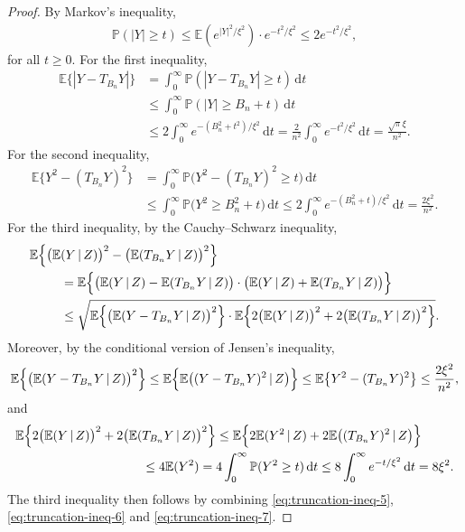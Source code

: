 \documentclass[12pt]{article}
\begin{document}
\begin{proof}
    By Markov's inequality,
    \begin{align*}
        \mathbb{P}(|Y|\geq t) \leq \mathbb{E}(e^{|Y|^2/\xi^2}) \cdot e^{-t^2/\xi^2} \leq 2e^{-t^2/\xi^2},
    \end{align*}
    for all $t\geq 0$. For the first inequality,
    \begin{align*}
        \mathbb{E}\{|Y - T_{B_n}Y|\} &= \int_0^{\infty} \mathbb{P}(|Y - T_{B_n}Y| \geq t) \,\mathrm{d}t\\
        &\leq \int_0^{\infty} \mathbb{P}(|Y| \geq B_n + t) \,\mathrm{d}t\\
        &\leq 2\int_0^{\infty} e^{-(B_n^2 + t^2)/\xi^2}\,\mathrm{d}t = \frac{2}{n^2} \int_0^{\infty} e^{-t^2/\xi^2}\,\mathrm{d}t = \frac{\sqrt{\pi} \xi}{n^2}.
    \end{align*}
    For the second inequality,
    \begin{align*}
        \mathbb{E}\bigl\{Y^2 - (T_{B_n}Y)^2\bigr\} &= \int_0^{\infty} \mathbb{P}\bigl(Y^2 - (T_{B_n}Y)^2 \geq t\bigr)\,\mathrm{d}t\\
        &\leq \int_0^{\infty} \mathbb{P}\bigl(Y^2 \geq B_n^2 + t\bigr) \,\mathrm{d}t \leq 2 \int_0^{\infty} e^{-(B_n^2 + t)/\xi^2} \,\mathrm{d}t = \frac{2\xi^2}{n^2}.
    \end{align*}
    For the third inequality, by the Cauchy--Schwarz inequality,
    \begin{align}
        \mathbb{E}\Bigl\{\bigl(\mathbb{E}&(Y\,|\,Z)\bigr)^2 - \bigl(\mathbb{E}(T_{B_n}Y\,|\,Z)\bigr)^2 \Bigr\}\nonumber\\
        &= \mathbb{E}\Bigl\{\bigl(\mathbb{E}(Y\,|\,Z) -\mathbb{E}(T_{B_n}Y\,|\,Z)\bigr) \cdot \bigl(\mathbb{E}(Y\,|\,Z) +\mathbb{E}(T_{B_n}Y\,|\,Z)\bigr) \Bigr\} \nonumber\\
        &\leq \sqrt{\mathbb{E}\Bigl\{\bigl(\mathbb{E}(Y-T_{B_n}Y\,|\,Z)\bigr)^2\Bigr\} \cdot \mathbb{E}\Bigl\{2\bigl(\mathbb{E}(Y\,|\,Z)\bigr)^2 + 2\bigl(\mathbb{E}(T_{B_n}Y\,|\,Z)\bigr)^2 \Bigr\}}. \label{eq:truncation-ineq-5}
    \end{align}
    Moreover, by the conditional version of Jensen's inequality,
    \begin{align}
        \mathbb{E}\Bigl\{\bigl(\mathbb{E}(Y-T_{B_n}Y\,|\,Z)\bigr)^2\Bigr\} \leq \mathbb{E}\Bigl\{\mathbb{E}\bigl((Y-T_{B_n}Y)^2\,|\,Z\bigr)\Bigr\} \leq \mathbb{E}\bigl\{Y^2 - (T_{B_n}Y)^2\bigr\} \leq \frac{2\xi^2}{n^2}, \label{eq:truncation-ineq-6}
    \end{align}
    and
    \begin{align}
        \mathbb{E}\Bigl\{2\bigl(\mathbb{E}(Y\,|\,Z)\bigr)^2 + 2\bigl(\mathbb{E}(&T_{B_n}Y\,|\,Z)\bigr)^2 \Bigr\} \leq \mathbb{E}\Bigl\{2\mathbb{E}(Y^2\,|\,Z) + 2\mathbb{E}\bigl((T_{B_n}Y)^2\,|\,Z\bigr) \Bigr\}\nonumber\\
        &\leq 4\mathbb{E}(Y^2) = 4 \int_0^{\infty} \mathbb{P}(Y^2\geq t)\,\mathrm{d}t \leq 8 \int_0^{\infty} e^{-t/\xi^2}\,\mathrm{d}t = 8\xi^2. \label{eq:truncation-ineq-7}
    \end{align}
    The third inequality then follows by combining \eqref{eq:truncation-ineq-5}, \eqref{eq:truncation-ineq-6} and \eqref{eq:truncation-ineq-7}.
    

\end{proof}
\end{document}
